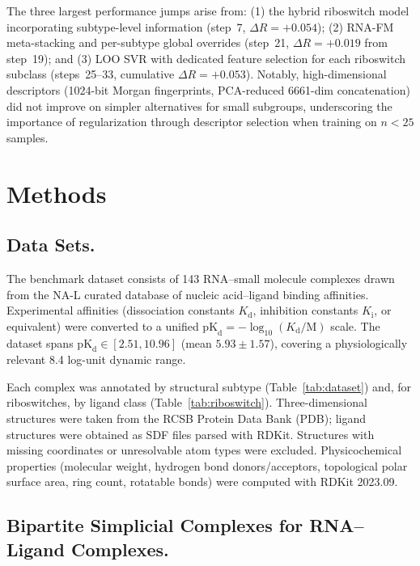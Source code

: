 \documentclass[10pt,twocolumn]{article}
\newcommand{\kD}{\text{pK}_{\mathrm{d}}}
\begin{document}
The three largest performance jumps arise from:
(1) the hybrid riboswitch model incorporating subtype-level information
(step~7, $\Delta R = +0.054$);
(2) RNA-FM meta-stacking and per-subtype global overrides
(step~21, $\Delta R = +0.019$ from step~19);
and (3) LOO SVR with dedicated feature selection for each riboswitch subclass
(steps~25--33, cumulative $\Delta R = +0.053$).
Notably, high-dimensional descriptors (1024-bit Morgan fingerprints, PCA-reduced
6661-dim concatenation) did not improve on simpler alternatives for small subgroups,
underscoring the importance of regularization through descriptor selection
when training on $n < 25$ samples.


\section{Methods}

\subsection{Data Sets.}

The benchmark dataset consists of 143 RNA--small molecule complexes drawn from
the NA-L curated database of nucleic acid--ligand binding affinities.\cite{NAL2020}
Experimental affinities (dissociation constants $K_\mathrm{d}$, inhibition
constants $K_\mathrm{i}$, or equivalent) were converted to a unified
$\kD = -\log_{10}(K_\mathrm{d}/\text{M})$ scale.
The dataset spans $\kD \in [2.51, 10.96]$ (mean $5.93 \pm 1.57$),
covering a physiologically relevant 8.4 log-unit dynamic range.

Each complex was annotated by structural subtype (Table~\ref{tab:dataset})
and, for riboswitches, by ligand class (Table~\ref{tab:riboswitch}).
Three-dimensional structures were taken from the RCSB Protein Data Bank\cite{Rose2015} (PDB);
ligand structures were obtained as SDF files parsed with RDKit.\cite{Landrum2013}
Structures with missing coordinates or unresolvable atom types were excluded.
Physicochemical properties (molecular weight, hydrogen bond donors/acceptors,
topological polar surface area, ring count, rotatable bonds)
were computed with RDKit 2023.09.\cite{Landrum2013}


\subsection{Bipartite Simplicial Complexes for RNA--Ligand Complexes.}
\end{document}
